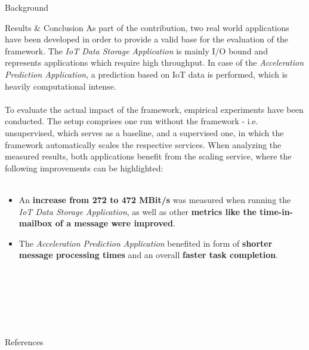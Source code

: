\documentclass[final,hyperref={pdfpagelabels=true}]{beamer}
\begin{document}
\begin{frame}
\begin{columns}[t]
\begin{column}{.48\textwidth}
\begin{block}{Background}
      \end{block}

      \begin{block}{Results \& Conclusion}
	As part of the contribution, two real world applications have been developed in order to provide a valid base for the evaluation of the framework.
	The \textit{IoT Data Storage Application} is mainly I/O bound and represents applications which require high throughput.
	In case of the \textit{Acceleration Prediction Application}, a prediction based on IoT data is performed, which is heavily computational intense.\\
	\hfill \\

	To evaluate the actual impact of the framework, empirical experiments have been conducted.
	The setup comprises one run without the framework - i.e. unsupervised, which serves as a baseline, and a supervised one, in which the framework automatically scales the respective services.
	When analyzing the measured results, both applications benefit from the scaling service, where the following improvements can be highlighted:\\
	\hfill \\

	\begin{itemize}
		\item An \textbf{increase from 272 to 472 MBit/s} was measured when running the \textit{IoT Data Storage Application}, as well as other \textbf{metrics like the time-in-mailbox of a message were improved}.
		\item The \textit{Acceleration Prediction Application} benefited in form of \textbf{shorter message processing times} and an overall \textbf{faster task completion}.
	\end{itemize}
      \end{block}

\hfill \\ \hfill \\ \hfill \\  \hfill \\  \hfill \\
      \begin{block}{References}
		\begin{footnotesize}
			
			
		\end{footnotesize}
      \end{block}

    \end{column}


\end{columns}
\end{frame}
\end{document}
